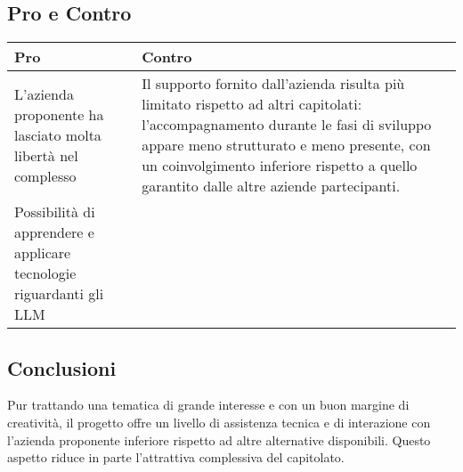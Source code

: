 \documentclass[a4paper,12pt]{article}
\begin{document}
{    \subsection*{Pro e Contro}{

        \begin{center} 
            \begin{tabular}{|p{5cm}|p{8cm}|}
                \hline
                \textbf{Pro} & \textbf{Contro} \\
                \hline
                L'azienda proponente ha lasciato molta libertà nel complesso &  Il supporto fornito dall'azienda risulta più limitato rispetto ad altri capitolati: l'accompagnamento durante le fasi di sviluppo appare meno strutturato e meno presente, con un coinvolgimento inferiore rispetto a quello garantito dalle altre aziende partecipanti. \\
                \hline
                Possibilità di apprendere e applicare tecnologie riguardanti gli LLM & \\
                \hline
            \end{tabular}
        \end{center}

    }

    \subsection*{Conclusioni}{
        Pur trattando una tematica di grande interesse e con un buon margine di creatività, il progetto offre un livello di assistenza tecnica e di interazione con l'azienda proponente inferiore rispetto ad altre alternative disponibili. Questo aspetto riduce in parte l'attrattiva complessiva del capitolato.
    }
}

\newpage
\end{document}
